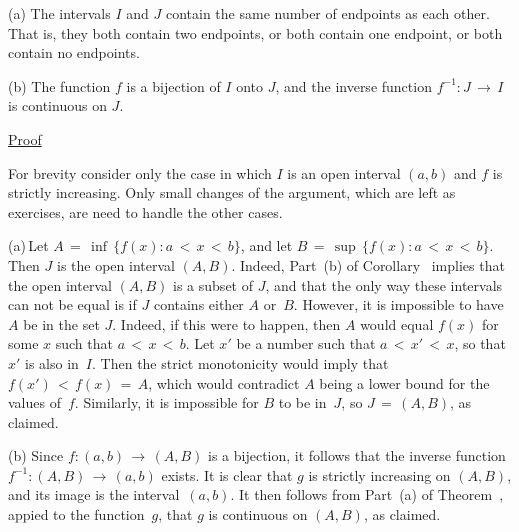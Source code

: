 \V

        (a) The intervals $I$ and $J$ contain the same number of endpoints as each other.
    That is, they both contain two endpoints, or both contain one endpoint, or both contain no endpoints.

\V

        (b) The function $f$ is a bijection of $I$ onto $J$, and the inverse function $f^{-1}:J \,{\rightarrow}\, I$ is continuous on $J$.

\V

        \underline{Proof} 

\V

        For brevity consider only the case in which $I$ is an open interval $(a,b)$ and $f$ is strictly increasing.
    Only small changes of the argument, which are left as exercises, are need to handle the other cases.

\V

        (a)\,Let $A \,=\, {\inf}\,\{f(x): a\,<\,x\,<\,b\}$, and let $B \,=\, {\sup}\,\{f(x): a\,<\,x\,<\,b\}$.
    Then $J$ is the open interval $(A,B)$. Indeed, Part~(b) of Corollary~
    implies that the open interval $(A,B)$ is a subset of $J$, and that the only way these intervals can not be equal is if $J$ contains either $A$ or~$B$.
    However, it is impossible to have $A$ be in the set $J$. Indeed, if this were to happen,
    then $A$ would equal $f(x)$ for some $x$ such that $a\,<\,x\,<\,b$. Let $x'$ be a number such that $a\,<\,x'\,<\,x$, so that $x'$ is also in~$I$.
    Then the strict monotonicity would imply that $f(x')\,<\,f(x) \,=\, A$, which would contradict $A$ being a lower bound for the values of~$f$.
    Similarly, it is impossible for $B$ to be in~$J$, so $J \,=\, (A,B)$, as claimed.

\V

        (b) Since $f:(a,b) \,{\rightarrow}\, (A,B)$ is a bijection, it follows that the inverse function $f^{-1}:(A,B) \,{\rightarrow}\, (a,b)$ exists.
    It is clear that $g$ is strictly increasing on $(A,B)$, and its image is the interval~$(a,b)$.
    It then follows from Part~(a) of Theorem~, appied to the function~$g$, that $g$ is continuous on $(A,B)$, as claimed.

\VV



